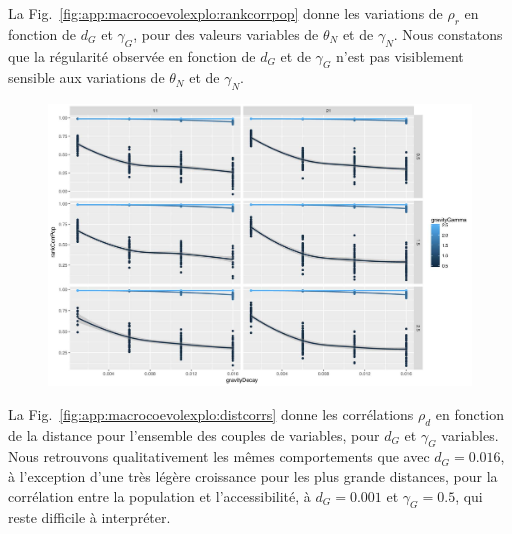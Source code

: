 La Fig.~\ref{fig:app:macrocoevolexplo:rankcorrpop} donne les variations de $\rho_r$ en fonction de $d_G$ et $\gamma_G$, pour des valeurs variables de $\theta_N$ et de $\gamma_N$. Nous constatons que la régularité observée en fonction de $d_G$ et de $\gamma_G$ n'est pas visiblement sensible aux variations de $\theta_N$ et de $\gamma_N$.


\begin{figure}
    \includegraphics[width=\linewidth]{Figures/Final/A-macrocoevolexplo-rankcorrpop.jpg}
\end{figure}


La Fig.~\ref{fig:app:macrocoevolexplo:distcorrs} donne les corrélations $\rho_d$ en fonction de la distance pour l'ensemble des couples de variables, pour $d_G$ et $\gamma_G$ variables. Nous retrouvons qualitativement les mêmes comportements que avec $d_G = 0.016$, à l'exception d'une très légère croissance pour les plus grande distances, pour la corrélation entre la population et l'accessibilité, à $d_G=0.001$ et $\gamma_G = 0.5$, qui reste difficile à interpréter.


